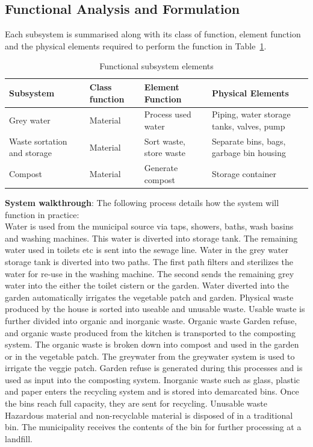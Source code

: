\documentclass[a4paper,11pt,fleqn]{report}
\begin{document}
\subsection{Functional Analysis and Formulation} 
Each subsystem is summarised along with its class of function, element function and the physical elements required to perform the function in Table~\ref{tb: Functional_SS_elements}.\\

\begin{table}[h!]
\caption {Functional subsystem elements} \label{tb: Functional_SS_elements} 
\begin{center}
\begin{tabular}{p{3.5cm}|p{3cm}|p{3cm}|p{4cm}}\toprule
	{\textbf{Subsystem}} & {\textbf{Class function}} & {\textbf{Element Function}} & {\textbf{Physical Elements}}\\ \midrule
    Grey water & Material & Process used water & Piping, water storage tanks, valves, pump\\
    \hline
    Waste sortation and storage & Material & Sort waste, store waste & Separate bins, bags, garbage bin housing\\
    \hline
        Compost & Material & Generate compost & Storage container\\
    \bottomrule
\end{tabular}
\end{center}
\end{table}

\textbf{System walkthrough}: The following process details how the system will function in practice:\\

Water is used from the municipal source via taps, showers, baths, wash basins and washing machines. This water is diverted into storage tank. The remaining water used in toilets etc is sent into the sewage line. Water in the grey water storage tank is diverted into two paths. The first path filters and sterilizes the water for re-use in the washing machine. The second sends the remaining grey water into the either the toilet cistern or the garden.
Water diverted into the garden automatically irrigates the vegetable patch and garden. Physical waste produced by the house is sorted into useable and unusable waste. Usable waste is further divided into organic and inorganic waste. Organic waste
Garden refuse, and organic waste produced from the kitchen is transported to the composting system.
The organic waste is broken down into compost and used in the garden or in the vegetable patch.
The greywater from the greywater system is used to irrigate the veggie patch. Garden refuse is generated during this processes and is used as input into the composting system. Inorganic waste such as glass, plastic and paper enters the recycling system and is stored into demarcated bins. Once the bins reach full capacity, they are sent for recycling. Unusable waste
Hazardous material and non-recyclable material is disposed of in a traditional bin. The municipality receives the contents of the bin for further processing at a landfill.
\end{document}
